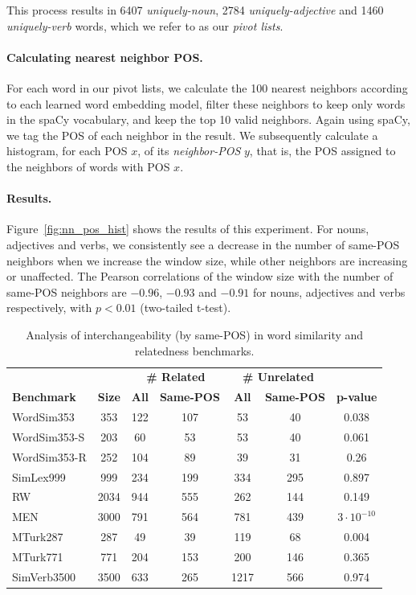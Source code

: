 \documentclass[11pt,a4paper]{article}
\begin{document}
    This process results in 6407 \textit{uniquely-noun}, 2784 \textit{uniquely-adjective}
    and 1460 \textit{uniquely-verb} words, which we refer to as our \textit{pivot lists}.
    
    \paragraph{Calculating nearest neighbor POS.}
    
    For each word in our pivot lists, we calculate the 100 nearest neighbors
    according to each learned word embedding model, filter these neighbors to
    keep only words in the spaCy vocabulary, and keep the top 10 valid neighbors.
    Again using spaCy, we tag the POS of each neighbor in the result.
    We subsequently calculate a histogram, for each POS $x$, of its
    \textit{neighbor-POS} $y$, that is, the POS assigned to the neighbors of
    words with POS $x$.
    
    \paragraph{Results.}
    
    Figure~\ref{fig:nn_pos_hist} shows the results of this experiment.
    For nouns, adjectives and verbs, we consistently see a decrease in
    the number of same-POS neighbors when we increase the window size,
    while other neighbors are increasing or unaffected.
    The Pearson correlations of the window size with the number of same-POS
    neighbors are $-0.96$, $-0.93$ and $-0.91$ for nouns, adjectives and verbs respectively,
    with $p<0.01$ (two-tailed t-test).
    
    \begin{table}[ht]
    \centering
    \begin{tabular}{l|c|cc|cc|c}
    \hline
    && \multicolumn{2}{c|}{\bf \# Related} & \multicolumn{2}{c|}{\bf \# Unrelated} & \\
    \bf Benchmark & \bf Size & \bf All & \bf Same-POS & \bf All & \bf Same-POS & \bf p-value \\
    \hline
	WordSim353 & 353 & 122 & 107 & 53 & 40 & 0.038 \\
    WordSim353-S & 203 & 60 & 53 & 53 & 40 & 0.061 \\
    WordSim353-R & 252 & 104 & 89 & 39 & 31 & 0.26 \\
    SimLex999 & 999 & 234 & 199 & 334 & 295 & 0.897 \\
    RW & 2034 & 944 & 555 & 262 & 144 & 0.149 \\
    MEN & 3000 & 791 & 564 & 781 & 439 & $3\cdot10^{-10}$ \\
    MTurk287 & 287 & 49 & 39 & 119 & 68 & 0.004 \\
    MTurk771 & 771 & 204 & 153 & 200 & 146 & 0.365 \\
    SimVerb3500 & 3500 & 633 & 265 & 1217 & 566 & 0.974
    \end{tabular}
    \caption{Analysis of interchangeability (by same-POS) in
    word similarity and relatedness benchmarks.
    \label{tab:benchmark_results}}
    \end{table}
    
\end{document}
